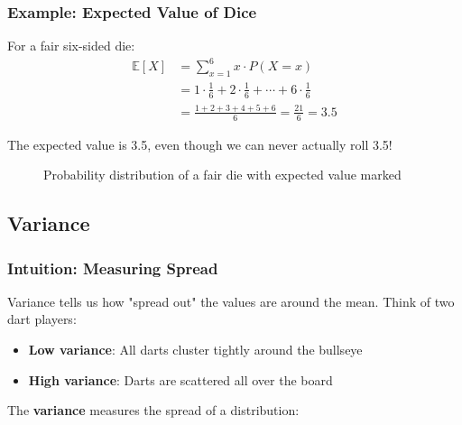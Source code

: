 \subsubsection{Example: Expected Value of Dice}

For a fair six-sided die:
\begin{align}
\mathbb{E}[X] &= \sum_{x=1}^{6} x \cdot P(X=x) \\
&= 1 \cdot \frac{1}{6} + 2 \cdot \frac{1}{6} + \cdots + 6 \cdot \frac{1}{6} \\
&= \frac{1+2+3+4+5+6}{6} = \frac{21}{6} = 3.5
\end{align}

The expected value is 3.5, even though we can never actually roll 3.5!

\begin{figure}[h]
\centering
{}
\caption{Probability distribution of a fair die with expected value marked}
\label{fig:dice-expectation}
\end{figure}

\subsection{Variance}

\subsubsection{Intuition: Measuring Spread}

Variance tells us how "spread out" the values are around the mean. Think of two dart players:
\begin{itemize}
    \item \textbf{Low variance}: All darts cluster tightly around the bullseye
    \item \textbf{High variance}: Darts are scattered all over the board
\end{itemize}

The \textbf{variance} measures the spread of a distribution:

